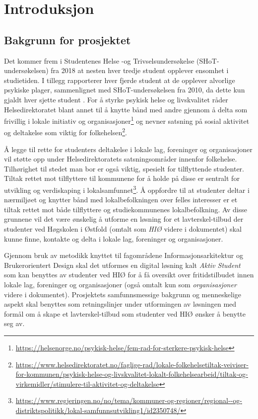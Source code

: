 \cleardoublepage
\chapter{Introduksjon}
\label{chap:intro}

\section{Bakgrunn for prosjektet}
Det kommer frem i Studentenes Helse -og Trivselsundersøkelse (SHoT-undersøkelsen) fra 2018 at nesten hver tredje student opplever ensomhet i studietiden. I tillegg rapporterer hver fjerde student at de opplever alvorlige psykiske plager, sammenlignet med SHoT-undersøkelsen fra 2010, da dette kun gjaldt hver sjette student \cite{SHOT:2}. For å styrke psykisk helse og livskvalitet råder Helsedirektoratet blant annet til å knytte bånd med andre gjennom å delta som frivillig i lokale initiativ og organisasjoner\footnote{\url{https://helsenorge.no/psykisk-helse/fem-rad-for-sterkere-psykisk-helse}} og nevner satsning på sosial aktivitet og deltakelse som viktig for folkehelsen\footnote{\url{https://www.helsedirektoratet.no/faglige-rad/lokale-folkehelsetiltak-veiviser-for-kommunen/psykisk-helse-og-livskvalitet-lokalt-folkehelsearbeid/tiltak-og-virkemidler/stimulere-til-aktivitet-og-deltakelse}}. 

Å legge til rette for studenters deltakelse i lokale lag, foreninger og organisasjoner vil støtte opp under Helsedirektoratets satsningsområder innenfor folkehelse. Tilhørighet til stedet man bor er også viktig, spesielt for tilflyttende studenter. Tiltak rettet mot tilflyttere til kommunene for å holde på disse er sentralt for utvikling og verdiskaping i lokalsamfunnet\footnote{\url{https://www.regjeringen.no/no/tema/kommuner-og-regioner/regional--og-distriktspolitikk/lokal-samfunnsutvikling1/id2350748/}}. Å oppfordre til at studenter deltar i nærmiljøet og knytter bånd med lokalbefolkningen over felles interesser er et tiltak rettet mot både tilflyttere og studiekommunenes lokalbefolkning. Av disse grunnene vil det være ønskelig å utforme en løsning for et lavterskel-tilbud der studenter ved Høgskolen i Østfold (omtalt som {\em HIØ} videre i dokumentet) skal kunne finne, kontakte og delta i lokale lag, foreninger og organisasjoner.

Gjennom bruk av metodikk knyttet til fagområdene Informasjonsarkitektur og Brukerorientert Design skal det utformes en digital løsning kalt {\em Aktiv Student} som kan benyttes av studenter ved HIØ for å få oversikt over fritidstilbudet innen lokale lag, foreninger og organisasjoner (også omtalt kun som {\em organisasjoner} videre i dokumentet). Prosjektets samfunnsmessige bakgrunn og menneskelige aspekt skal benyttes som retningslinjer under utformingen av løsningen med formål om å skape et lavterskel-tilbud som studenter ved HIØ ønsker å benytte seg av.

